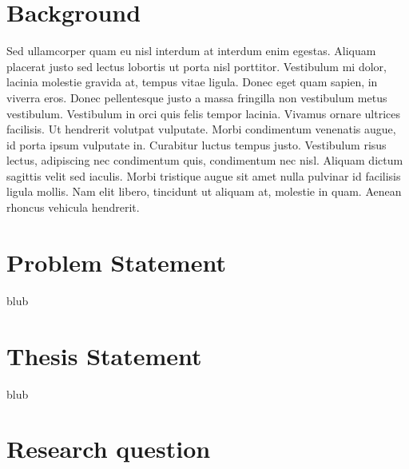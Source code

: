 
\section{Background}

Sed ullamcorper quam eu nisl interdum at interdum enim egestas. Aliquam placerat justo sed lectus lobortis ut porta nisl porttitor. Vestibulum mi dolor, lacinia molestie gravida at, tempus vitae ligula. Donec eget quam sapien, in viverra eros. Donec pellentesque justo a massa fringilla non vestibulum metus vestibulum. Vestibulum in orci quis felis tempor lacinia. Vivamus ornare ultrices facilisis. Ut hendrerit volutpat vulputate. Morbi condimentum venenatis augue, id porta ipsum vulputate in. Curabitur luctus tempus justo. Vestibulum risus lectus, adipiscing nec condimentum quis, condimentum nec nisl. Aliquam dictum sagittis velit sed iaculis. Morbi tristique augue sit amet nulla pulvinar id facilisis ligula mollis. Nam elit libero, tincidunt ut aliquam at, molestie in quam. Aenean rhoncus vehicula hendrerit.


\section{Problem Statement}

blub



\section{Thesis Statement}

blub



\section{Research question}

